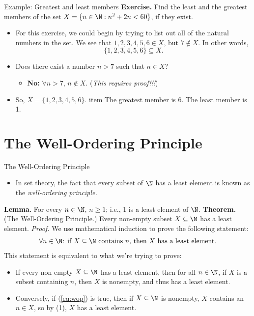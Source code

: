 \documentclass[11pt,aspectratio=1610,handout]{beamer}
\begin{document}
\begin{frame}{Example: Greatest and least members}
	\textbf{Exercise.} Find the least and the greatest members of the set $X = \{n \in \N: n^2 + 2n < 60\}$, if they exist. 
	 \p

	\begin{itemize}
		\item For this exercise, we could begin by trying to list out all of the natural numbers in the set. We see that $1,2,3,4,5,6 \in X$, but $7 \not\in X$. In other words, 
		\[
		\{1,2,3,4,5,6\} \subseteq X.
		\]\p 
		\item Does there exist a number $n > 7$ such that $n \in X$? 
		\begin{itemize}
			\item \textbf{No:} $\forall n > 7$, $n \not\in X$. (\emph{This requires proof!!!})
		\end{itemize} \p
		\item So, $X = \{1,2,3,4,5,6\}$. 
		item The greatest member is 6. The least member is 1. 
	\end{itemize}
\end{frame}


\section{The Well-Ordering Principle}

\begin{frame}{The Well-Ordering Principle}
			\begin{itemize}
				\item In set theory, the fact that every subset of $\N$ has a least element is known as the \emph{well-ordering principle.} 
		\end{itemize}
	\textbf{Lemma.} For every $n \in \N$, $n \geq 1$; i.e., 1 is a least element of $\N$. 
	\newline\newline \p
	\textbf{Theorem.} (The Well-Ordering Principle.) Every non-empty subset $X \subseteq \N$ has a least element. 
	\newline\newline \p
	\textit{Proof.} We use mathematical induction to prove the following statement: 
	\begin{equation}
	\textrm{$\forall n \in \N$: if $X\subseteq \N$ contains $n$, then $X$ has a least element.}\label{eq:wop}
	\end{equation} 
\p	This statement is equivalent to what we're trying to prove: 
	\begin{itemize}
		\item If every non-empty $X \subseteq \N$ has a least element, then for all $n \in \N$, if $X$ is a subset containing $n$, then $X$ is nonempty, and thus has a least element. \p
		\item Conversely, if (\ref{eq:wop}) is true, then if $X \subseteq \N$ is nonempty, $X$ contains an $n \in X$, so by (1), $X$ has a least element. 
	\end{itemize}
\end{frame}
\end{document}
